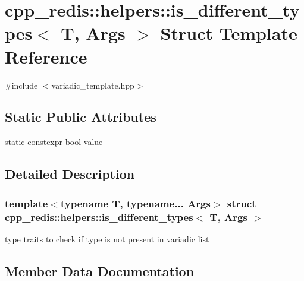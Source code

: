\hypertarget{structcpp__redis_1_1helpers_1_1is__different__types}{}\section{cpp\+\_\+redis\+:\+:helpers\+:\+:is\+\_\+different\+\_\+types$<$ T, Args $>$ Struct Template Reference}
\label{structcpp__redis_1_1helpers_1_1is__different__types}


{\ttfamily \#include $<$variadic\+\_\+template.\+hpp$>$}

\subsection*{Static Public Attributes}
\begin{DoxyCompactItemize}
\item 
static constexpr bool \hyperlink{structcpp__redis_1_1helpers_1_1is__different__types_a07dadd8ff3c8024734f231aaf1555626}{value}
\end{DoxyCompactItemize}


\subsection{Detailed Description}
\subsubsection*{template$<$typename T, typename... Args$>$\newline
struct cpp\+\_\+redis\+::helpers\+::is\+\_\+different\+\_\+types$<$ T, Args $>$}

type traits to check if type is not present in variadic list 

\subsection{Member Data Documentation}
\mbox{\label{structcpp__redis_1_1helpers_1_1is__different__types_a07dadd8ff3c8024734f231aaf1555626}} 
